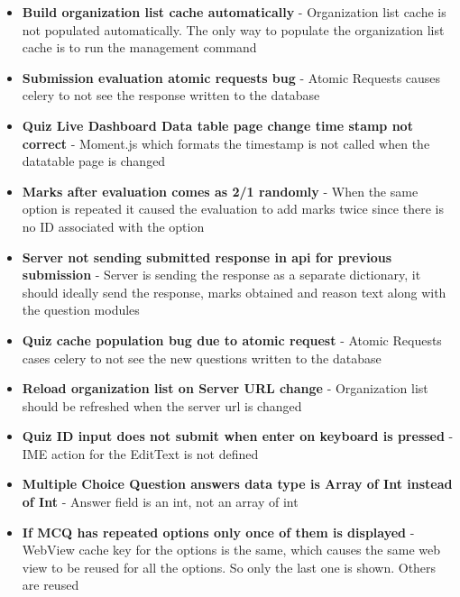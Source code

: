     \begin{itemize}
        \item \textbf{Build organization list cache automatically} - Organization list cache is not populated automatically. The only way to populate the organization list cache is to run the management command
        
        \item \textbf{Submission evaluation atomic requests bug} - Atomic Requests causes celery to not see the response written to the database
        
        \item \textbf{Quiz Live Dashboard Data table page change time stamp not correct} - Moment.js which formats the timestamp is not called when the datatable page is changed
        
        \item \textbf{Marks after evaluation comes as 2/1 randomly} - When the same option is repeated it caused the evaluation to add marks twice since there is no ID associated with the option
        
        \item \textbf{Server not sending submitted response in api for previous submission} - Server is sending the response as a separate dictionary, it should ideally send the response, marks obtained and reason text along with the question modules
        
        \item \textbf{Quiz cache population bug due to atomic request} - Atomic Requests cases celery to not see the new questions written to the database
        
        \item \textbf{Reload organization list on Server URL change} - Organization list should be refreshed when the server url is changed
        
        \item \textbf{Quiz ID input does not submit when enter on keyboard is pressed} - IME action for the EditText is not defined
        
        \item \textbf{Multiple Choice Question answers data type is Array of Int instead of Int} - Answer field is an int, not an array of int
        
        \item \textbf{If MCQ has repeated options only once of them is displayed} - WebView cache key for the options is the same, which causes the same web view to be reused for all the options. So only the last one is shown. Others are reused
        

\end{itemize}
